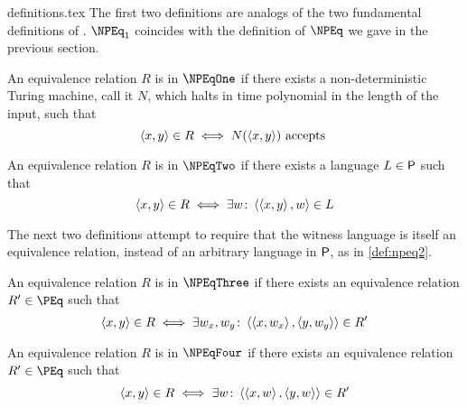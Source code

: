 \begin{filecontents}{definitions.tex}
The first two definitions are analogs of the two fundamental definitions of \NP.
$\NPEq_1$ coincides with the definition of $\NPEq$ we gave in the previous section.
\begin{definition}\label{def:npeq1}
  An equivalence relation $R$ is in $\NPEqOne$ if there exists a non-deterministic Turing machine, call it $N$, which halts in time polynomial in the length of the input, such that
  \begin{displaymath}
    \pair{x}{y}\in R\iff N(\pair{x}{y})\plain{accepts}
  \end{displaymath}
\end{definition}
\begin{definition}\label{def:npeq2}
  An equivalence relation $R$ is in $\NPEqTwo$ if there exists a language $L\in\P$ such that
  \begin{displaymath}
    \pair{x}{y}\in R\iff \exists w\colon \pair{\pair{x}{y}}{w}\in L
  \end{displaymath}
\end{definition}

The next two definitions attempt to require that the witness language is itself an equivalence relation, instead of an arbitrary language in $\P$, as in \ref{def:npeq2}.
\begin{definition}\label{def:npeq3}
  An equivalence relation $R$ is in $\NPEqThree$ if there exists an equivalence relation $R'\in \PEq$ such that
  \begin{displaymath}
    \pair{x}{y}\in R\iff \exists w_x,w_y\colon \pair{\pair{x}{w_x}}{\pair{y}{w_y}}\in R'
  \end{displaymath}
\end{definition}
\begin{definition}\label{def:npeq4}
  An equivalence relation $R$ is in $\NPEqFour$ if there exists an equivalence relation $R'\in \PEq$ such that
  \begin{displaymath}
    \pair{x}{y}\in R\iff \exists w\colon \pair{\pair{x}{w}}{\pair{y}{w}}\in R'
  \end{displaymath}
\end{definition}


\end{filecontents}
